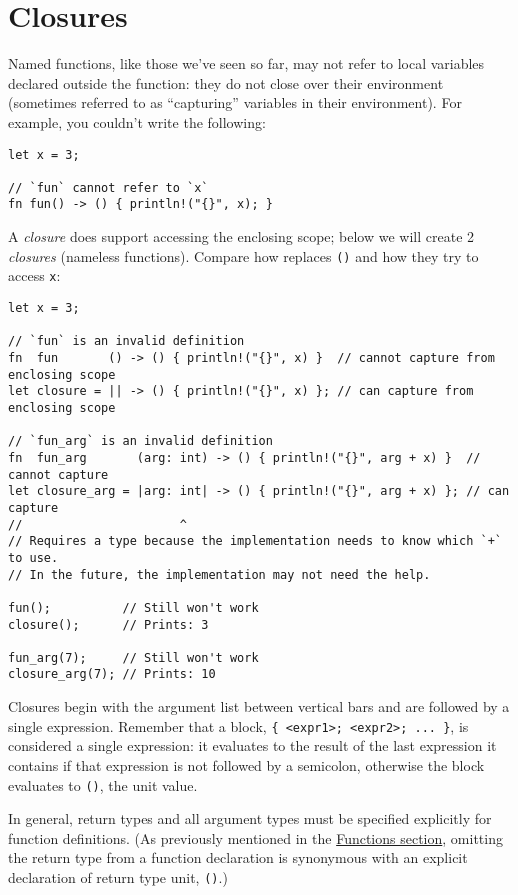 \documentclass[]{article}
\begin{document}
\section{Closures}\label{closures}

Named functions, like those we've seen so far, may not refer to local
variables declared outside the function: they do not close over their
environment (sometimes referred to as ``capturing'' variables in their
environment). For example, you couldn't write the following:

\begin{verbatim}
let x = 3;

// `fun` cannot refer to `x`
fn fun() -> () { println!("{}", x); }
\end{verbatim}

A \emph{closure} does support accessing the enclosing scope; below we
will create 2 \emph{closures} (nameless functions). Compare how
\texttt{\textbar{}\textbar{}} replaces \texttt{()} and how they try to
access \texttt{x}:

\begin{verbatim}
let x = 3;

// `fun` is an invalid definition
fn  fun       () -> () { println!("{}", x) }  // cannot capture from enclosing scope
let closure = || -> () { println!("{}", x) }; // can capture from enclosing scope

// `fun_arg` is an invalid definition
fn  fun_arg       (arg: int) -> () { println!("{}", arg + x) }  // cannot capture
let closure_arg = |arg: int| -> () { println!("{}", arg + x) }; // can capture
//                      ^
// Requires a type because the implementation needs to know which `+` to use.
// In the future, the implementation may not need the help.

fun();          // Still won't work
closure();      // Prints: 3

fun_arg(7);     // Still won't work
closure_arg(7); // Prints: 10
\end{verbatim}

Closures begin with the argument list between vertical bars and are
followed by a single expression. Remember that a block,
\texttt{\{ \textless{}expr1\textgreater{}; \textless{}expr2\textgreater{}; ... \}},
is considered a single expression: it evaluates to the result of the
last expression it contains if that expression is not followed by a
semicolon, otherwise the block evaluates to \texttt{()}, the unit value.

In general, return types and all argument types must be specified
explicitly for function definitions. (As previously mentioned in the
\hyperref[functions]{Functions section}, omitting the return type from a
function declaration is synonymous with an explicit declaration of
return type unit, \texttt{()}.)
\end{document}
